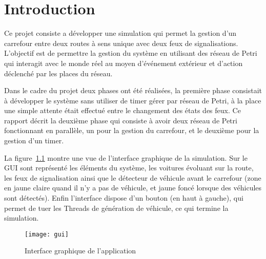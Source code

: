\chapter{Introduction}

Ce projet consiste a développer une simulation qui permet la gestion d'un carrefour entre deux routes à sens unique avec deux feux de signalisations. L'objectif est de permettre la gestion du système en utilisant des réseau de Petri qui interagit avec le monde réel au moyen d'événement extérieur et d'action déclenché par les places du réseau.

Dans le cadre du projet deux phases ont été réalisées, la première phase consistait à développer le système sans utiliser de timer gérer par réseau de Petri, à la place une simple attente était effectué entre le changement des états des feux. Ce rapport décrit la deuxième phase qui consiste à avoir deux réseau de Petri fonctionnant en parallèle, un pour la gestion du carrefour, et le deuxième pour la gestion d'un timer.

La figure~\ref{fig:gui} montre une vue de l'interface graphique de la simulation. Sur le GUI sont représenté les éléments du système, les voitures évoluant sur la route, les feux de signalisation ainsi que le détecteur de véhicule avant le carrefour (zone en jaune claire quand il n'y a pas de véhicule, et jaune foncé lorsque des véhicules sont détectés). Enfin l'interface dispose d'un bouton (en haut à gauche), qui permet de tuer les Threads de génération de véhicule, ce qui termine la simulation.

\begin{figure}[htb]
\centering 
\texttt{[image: gui]}
\caption[Interface graphique de l'application]{Interface graphique de l'application}
\label{fig:gui}
\end{figure}